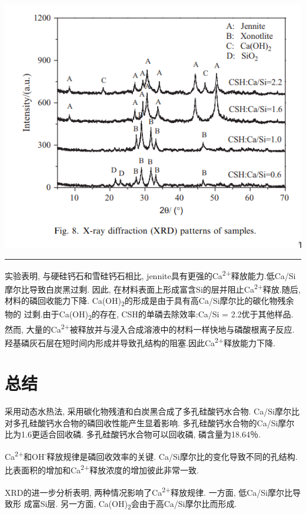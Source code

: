 \documentclass[11pt]{article}
\begin{document}
\includegraphics[scale=0.5]{fig.8.png}
 \label{tab:title}

\noindent\rule{\textwidth}{0.5pt}

实验表明, 与硬硅钙石和雪硅钙石相比, jennite具有更强的Ca\textsuperscript{2+}释放能力.低Ca/Si
摩尔比导致白炭黑过剩. 因此, 在材料表面上形成富含Si的层并阻止Ca\textsuperscript{2+}释放.随后,
材料的磷回收能力下降. Ca(OH)\textsubscript{2}的形成是由于具有高Ca/Si摩尔比的碳化物残余物的
过剩.由于Ca(OH)\textsubscript{2}的存在, CSH的单磷去除效率:Ca/Si = 2.2优于其他样品.然而,
大量的Ca\textsuperscript{2+}被释放并与浸入合成溶液中的材料一样快地与磷酸根离子反应.羟基磷灰石层在短时间内形成并导致孔结构的阻塞.因此Ca\textsuperscript{2+}释放能力下降.

\section{总结}
\label{sec:orgedf6469}
采用动态水热法, 采用碳化物残渣和白炭黑合成了多孔硅酸钙水合物. Ca/Si摩尔比对多孔硅酸钙水合物的磷回收性能产生显着影响. 多孔硅酸钙水合物的Ca/Si摩尔比为1.6更适合回收磷. 多孔硅酸钙水合物可以回收磷, 磷含量为18.64％.


Ca\textsuperscript{2+}和OH\textsuperscript{-}释放规律是磷回收效率的关键. Ca/Si摩尔比的变化导致不同的孔结构. 比表面积的增加和Ca\textsuperscript{2+}释放浓度的增加彼此非常一致.


XRD的进一步分析表明, 两种情况影响了Ca\textsuperscript{2+}释放规律. 一方面, 低Ca/Si摩尔比导致形
成富Si层. 另一方面, Ca(OH)\textsubscript{2}会由于高Ca/Si摩尔比而形成.




\end{document}
